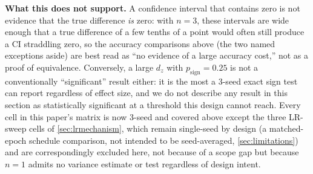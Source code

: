 \documentclass{article}
\theoremstyle{plain}
\theoremstyle{definition}
\theoremstyle{remark}
\begin{document}
\textbf{What this does not support.} A confidence interval that contains zero is not evidence that the true difference \emph{is} zero: with $n=3$, these intervals are wide enough that a true difference of a few tenths of a point would often still produce a CI straddling zero, so the accuracy comparisons above (the two named exceptions aside) are best read as ``no evidence of a large accuracy cost,'' not as a proof of equivalence. Conversely, a large $d_z$ with $p_{\mathrm{sign}}=0.25$ is not a conventionally ``significant'' result either: it is the most a 3-seed exact sign test can report regardless of effect size, and we do not describe any result in this section as statistically significant at a threshold this design cannot reach. Every cell in this paper's matrix is now 3-seed and covered above except the three LR-sweep cells of \cref{sec:lrmechanism}, which remain single-seed by design (a matched-epoch schedule comparison, not intended to be seed-averaged, \cref{sec:limitations}) and are correspondingly excluded here, not because of a scope gap but because $n=1$ admits no variance estimate or test regardless of design intent.
\end{document}
